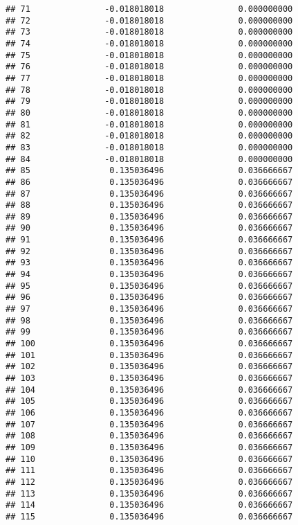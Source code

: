 \documentclass[]{article}
\begin{document}
\begin{verbatim}
## 71               -0.018018018               0.000000000
## 72               -0.018018018               0.000000000
## 73               -0.018018018               0.000000000
## 74               -0.018018018               0.000000000
## 75               -0.018018018               0.000000000
## 76               -0.018018018               0.000000000
## 77               -0.018018018               0.000000000
## 78               -0.018018018               0.000000000
## 79               -0.018018018               0.000000000
## 80               -0.018018018               0.000000000
## 81               -0.018018018               0.000000000
## 82               -0.018018018               0.000000000
## 83               -0.018018018               0.000000000
## 84               -0.018018018               0.000000000
## 85                0.135036496               0.036666667
## 86                0.135036496               0.036666667
## 87                0.135036496               0.036666667
## 88                0.135036496               0.036666667
## 89                0.135036496               0.036666667
## 90                0.135036496               0.036666667
## 91                0.135036496               0.036666667
## 92                0.135036496               0.036666667
## 93                0.135036496               0.036666667
## 94                0.135036496               0.036666667
## 95                0.135036496               0.036666667
## 96                0.135036496               0.036666667
## 97                0.135036496               0.036666667
## 98                0.135036496               0.036666667
## 99                0.135036496               0.036666667
## 100               0.135036496               0.036666667
## 101               0.135036496               0.036666667
## 102               0.135036496               0.036666667
## 103               0.135036496               0.036666667
## 104               0.135036496               0.036666667
## 105               0.135036496               0.036666667
## 106               0.135036496               0.036666667
## 107               0.135036496               0.036666667
## 108               0.135036496               0.036666667
## 109               0.135036496               0.036666667
## 110               0.135036496               0.036666667
## 111               0.135036496               0.036666667
## 112               0.135036496               0.036666667
## 113               0.135036496               0.036666667
## 114               0.135036496               0.036666667
## 115               0.135036496               0.036666667

\end{verbatim}
\end{document}

